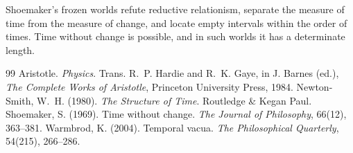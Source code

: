 \documentclass{situationist-preprint}
\begin{document}
Shoemaker's frozen worlds refute reductive relationism, separate the measure of time from the measure of change, and locate empty intervals within the order of times. Time without change is possible, and in such worlds it has a determinate length.

\begin{thebibliography}{99}\small
{} Aristotle. \emph{Physics}. Trans. R.~P. Hardie and R.~K. Gaye, in J. Barnes (ed.), \emph{The Complete Works of Aristotle}, Princeton University Press, 1984.
 Newton-Smith, W.~H. (1980). \emph{The Structure of Time}. Routledge \& Kegan Paul.
 Shoemaker, S. (1969). Time without change. \emph{The Journal of Philosophy}, 66(12), 363--381.
 Warmbrod, K. (2004). Temporal vacua. \emph{The Philosophical Quarterly}, 54(215), 266--286.
\end{thebibliography}
\end{document}
